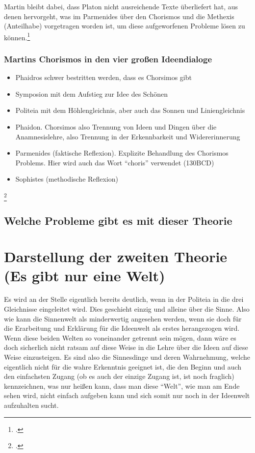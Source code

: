 \documentclass[12pt]{article}
\begin{document}
Martin bleibt dabei, dass Platon nicht ausreichende Texte überliefert hat, aus denen hervorgeht, was im Parmenides über den Chorismos und die Methexis (Anteilhabe) vorgetragen worden ist, um diese aufgeworfenen Probleme lösen zu können.\footcite[vgl.][S. 173f.]{Martin73}
\subsubsection*{Martins Chorismos in den vier großen Ideendialoge}

\begin{itemize}
    \item {Phaidros schwer bestritten werden, dass es Chorsimos gibt}
    \item {Symposion mit dem Aufstieg zur Idee des Schönen}
    \item {Politeia mit dem Höhlengleichnis, aber auch das Sonnen und Liniengleichnis}
    \item {Phaidon. Chorsimos also Trennung von Ideen und Dingen über die Anamnesislehre, also Trennung in der Erkennbarkeit und Widererinnerung}
    \item {Parmenides (faktische Reflexion). Explizite Behandlung des Chorismos Problems. Hier wird auch das Wort \enquote{choris} verwendet (130BCD)}
    \item {Sophistes (methodische Reflexion)}
\end{itemize}
\footcite[vgl.][S. 160]{Martin73}


\subsection{Welche Probleme gibt es mit dieser Theorie}

\section{Darstellung der zweiten Theorie (Es gibt nur eine Welt)}
Es wird an der Stelle eigentlich bereits deutlich, wenn in der Politeia in die drei Gleichnisse eingeleitet wird. Dies geschieht einzig und alleine über die Sinne. Also wie kann die Sinnenwelt als minderwertig angesehen werden, wenn sie doch für die Erarbeitung und Erklärung für die Ideenwelt als erstes herangezogen wird.
Wenn diese beiden Welten so voneinander getrennt sein mögen, dann wäre es doch sicherlich nicht ratsam auf diese Weise in die Lehre über die Ideen auf diese Weise einzusteigen. Es sind also die Sinnesdinge und deren Wahrnehmung, welche eigentlich nicht für die wahre Erkenntnis geeignet ist, die den Beginn und auch den einfachsten Zugang (ob es auch der einzige Zugang ist, ist noch fraglich) kennzeichnen, was nur heißen kann, dass man diese \enquote{Welt}, wie man am Ende sehen wird, nicht einfach aufgeben kann und sich somit nur noch in der Ideenwelt aufzuhalten sucht.
\end{document}
